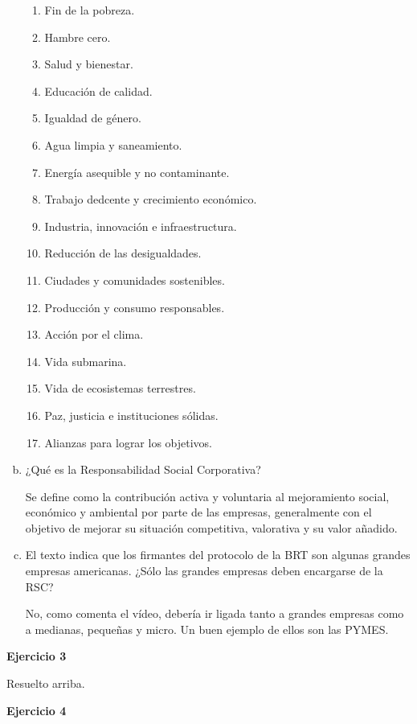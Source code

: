 \documentclass[12pt]{article}
\theoremstyle{definition}
\theoremstyle{remark}
\begin{document}
\begin{enumerate}[a)]
\begin{enumerate}[label=(\arabic*)]
\item Fin de la pobreza.
\item Hambre cero.
\item Salud y bienestar.
\item Educación de calidad.
\item Igualdad de género.
\item Agua limpia y saneamiento.
\item Energía asequible y no contaminante.
\item Trabajo dedcente y crecimiento económico.
\item Industria, innovación e infraestructura.
\item Reducción de las desigualdades.
\item Ciudades y comunidades sostenibles.
\item Producción y consumo responsables.
\item Acción por el clima.
\item Vida submarina.
\item Vida de ecosistemas terrestres.
\item Paz, justicia e instituciones sólidas.
\item  Alianzas para lograr los objetivos.
\end{enumerate}

\item ¿Qué es la Responsabilidad Social Corporativa?

Se define como la contribución activa y voluntaria al mejoramiento social, económico y ambiental por parte de las empresas, generalmente con el objetivo de mejorar su situación competitiva, valorativa y su valor añadido.

\item El texto indica que los firmantes del protocolo de la BRT son algunas grandes empresas americanas. ¿Sólo las grandes empresas deben encargarse de la RSC?

No, como comenta el vídeo, debería ir ligada tanto a grandes empresas como a medianas, pequeñas y micro. Un buen ejemplo de ellos son las PYMES.
\end{enumerate}

\textbf{Ejercicio 3}

Resuelto arriba.

\textbf{Ejercicio 4}
\end{document}

